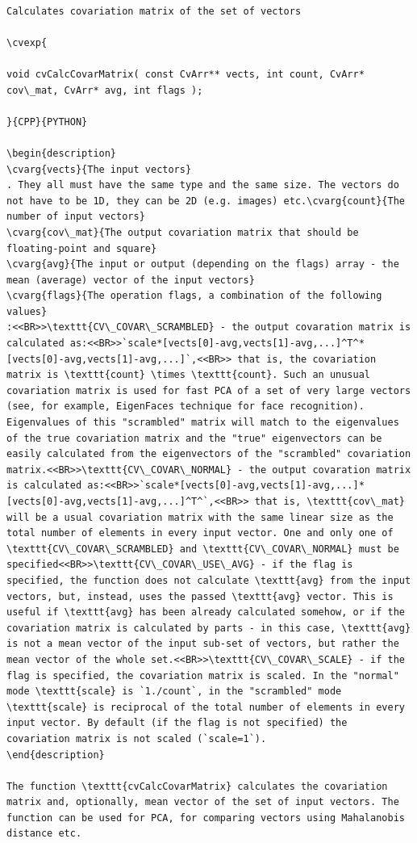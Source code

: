 \begin{verbatim}

Calculates covariation matrix of the set of vectors

\cvexp{

void cvCalcCovarMatrix( const CvArr** vects, int count, CvArr* cov\_mat, CvArr* avg, int flags );

}{CPP}{PYTHON}

\begin{description}
\cvarg{vects}{The input vectors}
. They all must have the same type and the same size. The vectors do not have to be 1D, they can be 2D (e.g. images) etc.\cvarg{count}{The number of input vectors}
\cvarg{cov\_mat}{The output covariation matrix that should be floating-point and square}
\cvarg{avg}{The input or output (depending on the flags) array - the mean (average) vector of the input vectors}
\cvarg{flags}{The operation flags, a combination of the following values}
:<<BR>>\texttt{CV\_COVAR\_SCRAMBLED} - the output covaration matrix is calculated as:<<BR>>`scale*[vects[0]-avg,vects[1]-avg,...]^T^*[vects[0]-avg,vects[1]-avg,...]`,<<BR>> that is, the covariation matrix is \texttt{count} \times \texttt{count}. Such an unusual covariation matrix is used for fast PCA of a set of very large vectors (see, for example, EigenFaces technique for face recognition). Eigenvalues of this "scrambled" matrix will match to the eigenvalues of the true covariation matrix and the "true" eigenvectors can be easily calculated from the eigenvectors of the "scrambled" covariation matrix.<<BR>>\texttt{CV\_COVAR\_NORMAL} - the output covaration matrix is calculated as:<<BR>>`scale*[vects[0]-avg,vects[1]-avg,...]*[vects[0]-avg,vects[1]-avg,...]^T^`,<<BR>> that is, \texttt{cov\_mat} will be a usual covariation matrix with the same linear size as the total number of elements in every input vector. One and only one of \texttt{CV\_COVAR\_SCRAMBLED} and \texttt{CV\_COVAR\_NORMAL} must be specified<<BR>>\texttt{CV\_COVAR\_USE\_AVG} - if the flag is specified, the function does not calculate \texttt{avg} from the input vectors, but, instead, uses the passed \texttt{avg} vector. This is useful if \texttt{avg} has been already calculated somehow, or if the covariation matrix is calculated by parts - in this case, \texttt{avg} is not a mean vector of the input sub-set of vectors, but rather the mean vector of the whole set.<<BR>>\texttt{CV\_COVAR\_SCALE} - if the flag is specified, the covariation matrix is scaled. In the "normal" mode \texttt{scale} is `1./count`, in the "scrambled" mode \texttt{scale} is reciprocal of the total number of elements in every input vector. By default (if the flag is not specified) the covariation matrix is not scaled (`scale=1`).
\end{description}

The function \texttt{cvCalcCovarMatrix} calculates the covariation matrix and, optionally, mean vector of the set of input vectors. The function can be used for PCA, for comparing vectors using Mahalanobis distance etc.


\end{verbatim}
